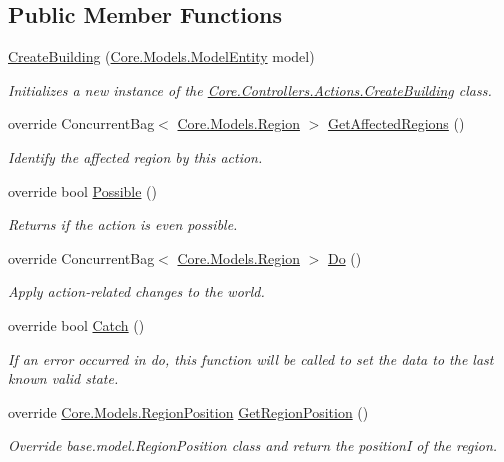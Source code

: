 \subsection*{Public Member Functions}
\begin{DoxyCompactItemize}
\item 
\hyperlink{classCore_1_1Controllers_1_1Actions_1_1CreateBuilding_a1a7f34a6677fffc7fec4af294836a0b3}{Create\+Building} (\hyperlink{classCore_1_1Models_1_1ModelEntity}{Core.\+Models.\+Model\+Entity} model)
\begin{DoxyCompactList}\small\item\em Initializes a new instance of the \hyperlink{classCore_1_1Controllers_1_1Actions_1_1CreateBuilding}{Core.\+Controllers.\+Actions.\+Create\+Building} class. \end{DoxyCompactList}\item 
override Concurrent\+Bag$<$ \hyperlink{classCore_1_1Models_1_1Region}{Core.\+Models.\+Region} $>$ \hyperlink{classCore_1_1Controllers_1_1Actions_1_1CreateBuilding_a456e8ed7d1da08bd5da0baf58600a227}{Get\+Affected\+Regions} ()
\begin{DoxyCompactList}\small\item\em Identify the affected region by this action. \end{DoxyCompactList}\item 
override bool \hyperlink{classCore_1_1Controllers_1_1Actions_1_1CreateBuilding_a254e5f630e31046dfb9bdc5e8b25d7d9}{Possible} ()
\begin{DoxyCompactList}\small\item\em Returns if the action is even possible. \end{DoxyCompactList}\item 
override Concurrent\+Bag$<$ \hyperlink{classCore_1_1Models_1_1Region}{Core.\+Models.\+Region} $>$ \hyperlink{classCore_1_1Controllers_1_1Actions_1_1CreateBuilding_a6f640077d26410e8ea891b7300654c61}{Do} ()
\begin{DoxyCompactList}\small\item\em Apply action-\/related changes to the world. \end{DoxyCompactList}\item 
override bool \hyperlink{classCore_1_1Controllers_1_1Actions_1_1CreateBuilding_ad63ea1b154c0f04d79ed9a6316d41382}{Catch} ()
\begin{DoxyCompactList}\small\item\em If an error occurred in do, this function will be called to set the data to the last known valid state. \end{DoxyCompactList}\item 
override \hyperlink{classCore_1_1Models_1_1RegionPosition}{Core.\+Models.\+Region\+Position} \hyperlink{classCore_1_1Controllers_1_1Actions_1_1CreateBuilding_a65ab8070b1fd436ee2f48c2c84b9ff57}{Get\+Region\+Position} ()
\begin{DoxyCompactList}\small\item\em Override base.\+model.\+Region\+Position class and return the position\+I of the region. \end{DoxyCompactList}\end{DoxyCompactItemize}

